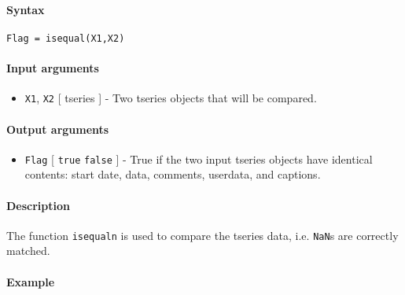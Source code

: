 


	\paragraph{Syntax}

\begin{verbatim}
Flag = isequal(X1,X2)
\end{verbatim}

\paragraph{Input arguments}

\begin{itemize}
\itemsep1pt\parskip0pt
\item
  \texttt{X1}, \texttt{X2} {[} tseries {]} - Two tseries objects that
  will be compared.
\end{itemize}

\paragraph{Output arguments}

\begin{itemize}
\itemsep1pt\parskip0pt
\item
  \texttt{Flag} {[} \texttt{true} \textbar{} \texttt{false} {]} - True
  if the two input tseries objects have identical contents: start date,
  data, comments, userdata, and captions.
\end{itemize}

\paragraph{Description}

The function \texttt{isequaln} is used to compare the tseries data, i.e.
\texttt{NaN}s are correctly matched.

\paragraph{Example}


